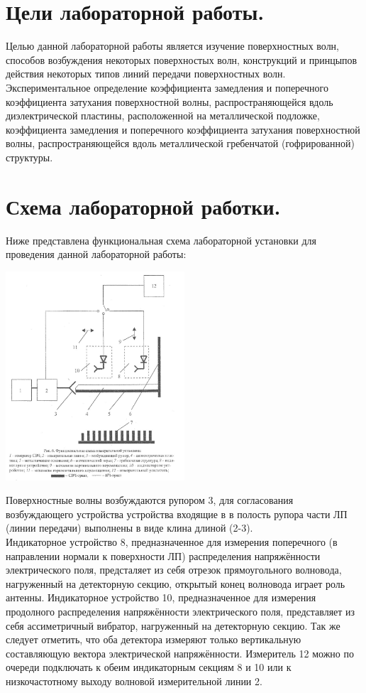 \documentclass[a4paper, titlepage, 10pt]{article}
\begin{document}

\appendix
\section*{Цели лабораторной работы.}
\indent Целью данной лабораторной работы является изучение поверхностных волн, способов возбуждения некоторых поверхностых волн, конструкций и принцыпов действия некоторых типов линий передачи поверхностных волн. Экспериментальное определение коэффициента замедления и поперечного коэффициента затухания поверхностной волны, распространяющейся вдоль диэлектрической пластины, расположенной на металлической подложке, коэффициента замедления и поперечного коэффициента затухания поверхностной волны, распространяющейся вдоль металлической гребенчатой (гофрированной) структуры.
\appendix
\section*{Схема лабораторной работки.}
Ниже представлена функциональная схема лабораторной установки для проведения данной лабораторной работы:
\\
\begin{center}
\includegraphics[width=0.5\textwidth]{07.jpeg}
\end{center}
Поверхностные волны возбуждаются рупором 3, для согласования возбуждающего устройства устройства входящие в в полость рупора части ЛП (линии передачи) выполнены в виде клина длиной (2-3). \\Индикаторное устройство 8, предназначенное для измерения поперечного (в направлении нормали к поверхности ЛП) распределения напряжённости электрического поля, предсталяет из себя отрезок прямоугольного волновода, нагруженный на детекторную секцию, открытый конец волновода играет роль антенны. Индикаторное устройство 10, предназначенное для измерения продолного распределения напряжённости электрического поля, представляет из себя ассиметричный вибратор, нагруженный на детекторную секцию. Так же следует отметить, что оба детектора измеряют только вертикальную составляющую вектора электрической напряжённости. Измеритель 12 можно по очереди подключать к обеим индикаторным секциям 8 и 10 или к низкочастотному выходу волновой измерительной линии 2. 
\\[2cm]
\vfill
\end{document}
